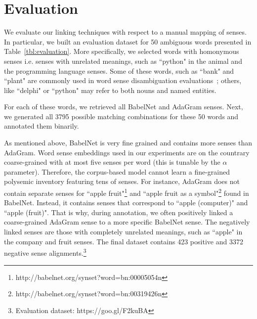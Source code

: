 \documentclass[10pt, a4paper]{article}
\begin{document}
\section{Evaluation}

We  evaluate our linking techniques with respect to a manual mapping of senses. In particular, we built an evaluation dataset for 50 ambiguous words  presented in Table~\ref{tbl:evaluation}. More specifically, we selected words with homonymous senses i.e. senses with unrelated meanings, such as ``python" in the animal and the programming language senses. Some of these words, such as ``bank" and ``plant" are commonly used in word sense disambiguation evaluations~\cite{navigli2007semeval,manandhar2010semeval,jurgens2013semeval}; others, like ``delphi" or ``python" may refer to both nouns and named entities.  


For each of these words, we retrieved all BabelNet and AdaGram senses. Next, we generated all 3795 possible matching combinations for these 50 words and annotated them binarily. 


As mentioned above, BabelNet is very fine grained and contains more senses than AdaGram. Word sense embeddings  used in our experiments are on the countrary  coarse-grained with at most five senses per word (this is tunable by the $\alpha$ parameter). Therefore, the corpus-based model cannot learn a fine-grained  polysemic inventory featuring tens of senses. For instance, AdaGram does not contain separate senses for  ``apple fruit"\footnote{http://babelnet.org/synset?word=bn:00005054n} and ``apple fruit as a symbol"\footnote{http://babelnet.org/synset?word=bn:00319426n} found in BabelNet. Instead, it contains senses that correspond to ``apple (computer)" and ``apple (fruit)". That is why, during annotation, we often positively linked a coarse-grained AdaGram sense to a more specific BabelNet sense. The negatively linked senses are those with completely unrelated meanings, such as ``apple" in the company and fruit senses. The final dataset contains 423 positive and 3372 negative sense alignments.\footnote{Evaluation dataset: https://goo.gl/F2kuBA}
\end{document}

